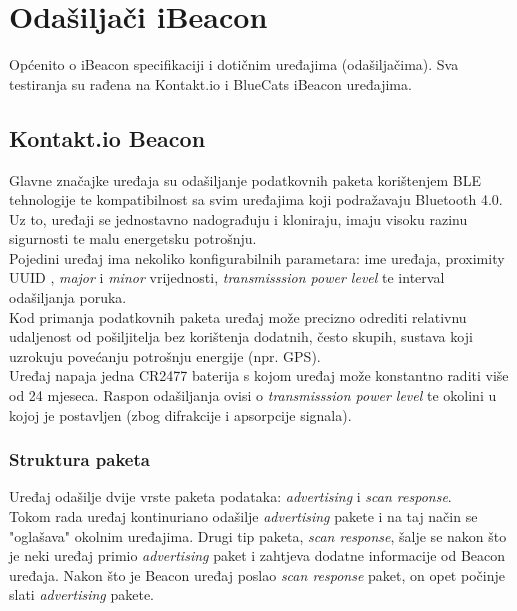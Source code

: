 \chapter{Odašiljači iBeacon}
Općenito o iBeacon specifikaciji i dotičnim uređajima (odašiljačima). Sva testiranja su rađena na Kontakt.io i BlueCats iBeacon uređajima.

\section*{Kontakt.io Beacon}
Glavne značajke uređaja su odašiljanje podatkovnih paketa korištenjem BLE tehnologije te kompatibilnost sa svim uređajima koji podražavaju Bluetooth 4.0. 
Uz to, uređaji se jednostavno nadograđuju i kloniraju, imaju visoku razinu sigurnosti te malu energetsku potrošnju.
\\
Pojedini uređaj ima nekoliko konfigurabilnih parametara: ime uređaja, proximity UUID , \textit{major} i \textit{minor} vrijednosti, \textit{transmisssion power level} te interval odašiljanja poruka.
\\
Kod primanja podatkovnih paketa uređaj može precizno odrediti relativnu udaljenost od pošiljitelja bez korištenja dodatnih, često skupih, sustava koji uzrokuju povećanju potrošnju energije (npr. GPS).
\\
Uređaj napaja jedna CR2477 baterija s kojom uređaj može konstantno raditi više od 24 mjeseca.
Raspon odašiljanja ovisi o \textit{transmisssion power level} te okolini u kojoj je postavljen (zbog difrakcije i apsorpcije signala).

\subsection*{Struktura paketa}
Uređaj odašilje dvije vrste paketa podataka: \textit{advertising} i \textit{scan response}.
\\
Tokom rada uređaj kontinuriano odašilje \textit{advertising} pakete i na taj način se "oglašava" okolnim uređajima. Drugi tip paketa, \textit{scan response}, šalje se nakon što je neki uređaj primio \textit{advertising} paket i zahtjeva dodatne informacije od Beacon uređaja. Nakon što je Beacon uređaj poslao \textit{scan response} paket, on opet počinje slati \textit{advertising} pakete.
\\

